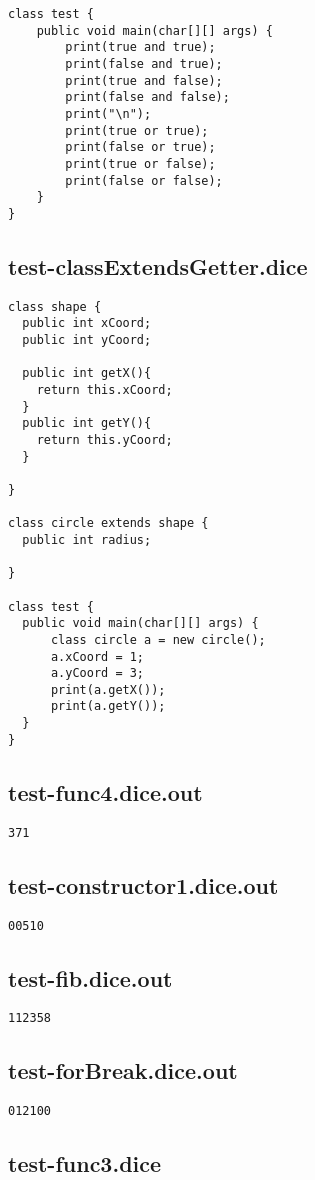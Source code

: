 \begin{verbatim}
class test {
	public void main(char[][] args) {
		print(true and true);
		print(false and true);
		print(true and false);
		print(false and false);
		print("\n");
		print(true or true);
		print(false or true);
		print(true or false);
		print(false or false);
	}
}
\end{verbatim}\pagebreak\subsection{test-classExtendsGetter.dice}
\begin{verbatim}
class shape {
  public int xCoord;
  public int yCoord;

  public int getX(){
  	return this.xCoord;
  }
  public int getY(){
   	return this.yCoord;
  }

}

class circle extends shape {
  public int radius;

}

class test {
  public void main(char[][] args) {
      class circle a = new circle(); 
      a.xCoord = 1;
      a.yCoord = 3;
      print(a.getX());
      print(a.getY());
  }
}
\end{verbatim}\pagebreak\subsection{test-func4.dice.out}
\begin{verbatim}
371
\end{verbatim}\pagebreak\subsection{test-constructor1.dice.out}
\begin{verbatim}
00510
\end{verbatim}\pagebreak\subsection{test-fib.dice.out}
\begin{verbatim}
112358
\end{verbatim}\pagebreak\subsection{test-forBreak.dice.out}
\begin{verbatim}
012100
\end{verbatim}\pagebreak\subsection{test-func3.dice}
